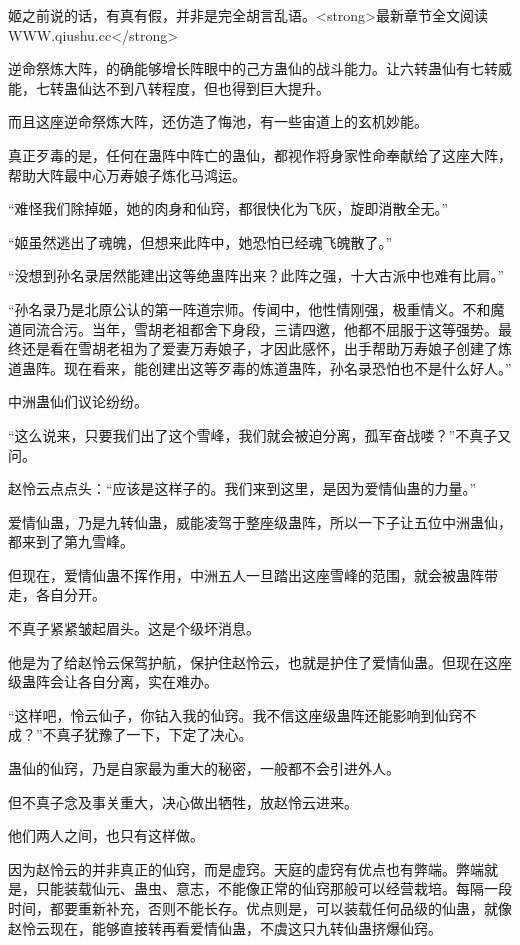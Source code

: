 \begin{this_body}
姬之前说的话，有真有假，并非是完全胡言乱语。<strong>最新章节全文阅读WWW.qiushu.cc</strong>

逆命祭炼大阵，的确能够增长阵眼中的己方蛊仙的战斗能力。让六转蛊仙有七转威能，七转蛊仙达不到八转程度，但也得到巨大提升。

而且这座逆命祭炼大阵，还仿造了悔池，有一些宙道上的玄机妙能。

真正歹毒的是，任何在蛊阵中阵亡的蛊仙，都视作将身家性命奉献给了这座大阵，帮助大阵最中心万寿娘子炼化马鸿运。

“难怪我们除掉姬，她的肉身和仙窍，都很快化为飞灰，旋即消散全无。”

“姬虽然逃出了魂魄，但想来此阵中，她恐怕已经魂飞魄散了。”

“没想到孙名录居然能建出这等绝蛊阵出来？此阵之强，十大古派中也难有比肩。”

“孙名录乃是北原公认的第一阵道宗师。传闻中，他性情刚强，极重情义。不和魔道同流合污。当年，雪胡老祖都舍下身段，三请四邀，他都不屈服于这等强势。最终还是看在雪胡老祖为了爱妻万寿娘子，才因此感怀，出手帮助万寿娘子创建了炼道蛊阵。现在看来，能创建出这等歹毒的炼道蛊阵，孙名录恐怕也不是什么好人。”

中洲蛊仙们议论纷纷。

“这么说来，只要我们出了这个雪峰，我们就会被迫分离，孤军奋战喽？”不真子又问。

赵怜云点点头：“应该是这样子的。我们来到这里，是因为爱情仙蛊的力量。”

爱情仙蛊，乃是九转仙蛊，威能凌驾于整座级蛊阵，所以一下子让五位中洲蛊仙，都来到了第九雪峰。

但现在，爱情仙蛊不挥作用，中洲五人一旦踏出这座雪峰的范围，就会被蛊阵带走，各自分开。

不真子紧紧皱起眉头。这是个级坏消息。

他是为了给赵怜云保驾护航，保护住赵怜云，也就是护住了爱情仙蛊。但现在这座级蛊阵会让各自分离，实在难办。

“这样吧，怜云仙子，你钻入我的仙窍。我不信这座级蛊阵还能影响到仙窍不成？”不真子犹豫了一下，下定了决心。

蛊仙的仙窍，乃是自家最为重大的秘密，一般都不会引进外人。

但不真子念及事关重大，决心做出牺牲，放赵怜云进来。

他们两人之间，也只有这样做。

因为赵怜云的并非真正的仙窍，而是虚窍。天庭的虚窍有优点也有弊端。弊端就是，只能装载仙元、蛊虫、意志，不能像正常的仙窍那般可以经营栽培。每隔一段时间，都要重新补充，否则不能长存。优点则是，可以装载任何品级的仙蛊，就像赵怜云现在，能够直接转再看爱情仙蛊，不虞这只九转仙蛊挤爆仙窍。


\end{this_body}
